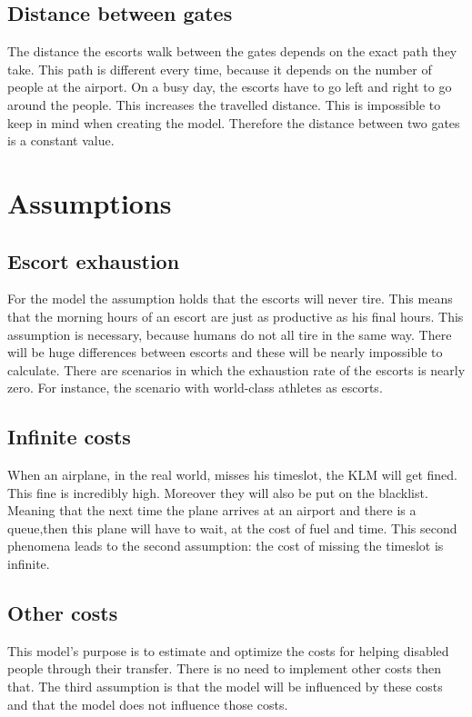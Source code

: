 \documentclass[a4paper, 11pt, notitlepage]{report}
\begin{document}
        \subsection{Distance between gates}
        The distance the escorts walk between the gates depends on the exact path they take. This path is different every time, because it depends on the number of people at the airport. On a busy day, the escorts have to go left and right to go around the people. This increases the travelled distance. This is impossible to keep in mind when creating the model. Therefore the distance between two gates is a constant value.

	\section{Assumptions}
		\subsection{Escort exhaustion} For the model the assumption holds that the escorts will never tire. This means that the morning hours of an escort are just as productive as his final hours. This assumption is necessary, because humans do not all tire in the same way. There will be huge differences between escorts and these will be nearly impossible to calculate. There are scenarios in which the exhaustion rate of the escorts is nearly zero. For instance, the scenario with world-class athletes as escorts.
		
		\subsection{Infinite costs} When an airplane, in the real world, misses his timeslot, the KLM will get fined. This fine is incredibly high. Moreover they will also be put on the blacklist. Meaning that the next time the plane arrives at an airport and there is a queue,then this plane will have to wait, at the cost of fuel and time. This second phenomena leads to the second assumption: the cost of missing the timeslot is infinite.
		
		\subsection{Other costs} This model's purpose is to estimate and optimize the costs for helping disabled people through their transfer. There is no need to implement other costs then that. The third assumption is that the model will be influenced by these costs and that the model does not influence those costs.
		
\end{document}
